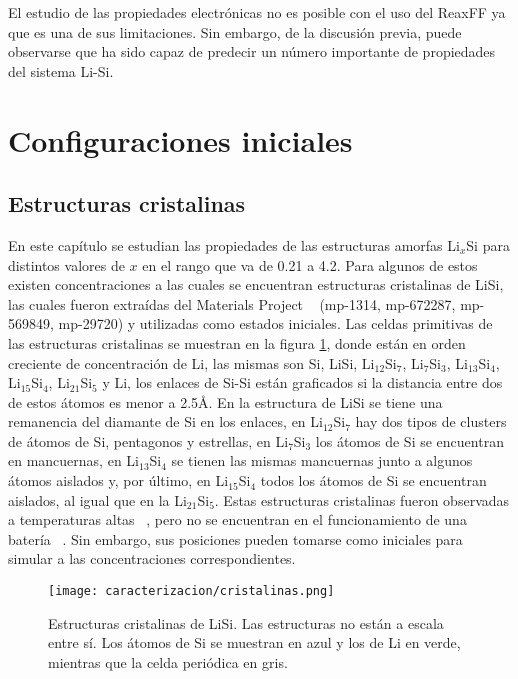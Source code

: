 El estudio de las propiedades electrónicas no es posible con el uso del ReaxFF ya
que es una de sus limitaciones. Sin embargo, de la discusión previa, puede 
observarse que ha sido capaz de predecir un número importante de propiedades del 
sistema Li-Si.


\section{Configuraciones iniciales}

\subsection{Estructuras cristalinas}

En este capítulo se estudian las propiedades de las estructuras amorfas Li$_x$Si
para distintos valores de $x$ en el rango que va de 0.21 a 4.2. Para algunos de
estos existen concentraciones a las cuales se encuentran estructuras cristalinas 
de LiSi, las cuales fueron extraídas del Materials Project 
~\cite{materials_project} (mp-1314, mp-672287, mp-569849, mp-29720) y utilizadas 
como estados iniciales. Las celdas primitivas de las estructuras cristalinas se
muestran en la figura \ref{fig:cristalinas}, donde están en orden creciente de 
concentración de Li, las mismas son Si, LiSi, Li$_{12}$Si$_7$, Li$_7$Si$_3$, 
Li$_{13}$Si$_4$, Li$_{15}$Si$_4$, Li$_{21}$Si$_5$ y Li, los enlaces de Si-Si 
están graficados si la distancia entre dos de estos átomos es menor a 2.5\AA. En 
la estructura de LiSi se tiene una remanencia del diamante de Si en los enlaces, 
en Li$_{12}$Si$_7$ hay dos tipos de clusters de átomos de Si, pentagonos y 
estrellas, en Li$_7$Si$_3$ los átomos de Si se encuentran en mancuernas, en 
Li$_{13}$Si$_4$ se tienen las mismas mancuernas junto a algunos átomos aislados y, 
por último, en Li$_{15}$Si$_{4}$ todos los átomos de Si se encuentran aislados,
al igual que en la Li$_{21}$Si$_5$. Estas estructuras cristalinas fueron 
observadas a temperaturas altas ~\cite{wen1981}, pero no se encuentran en el 
funcionamiento de una batería ~\cite{obrovac2004}. Sin embargo, sus posiciones 
pueden tomarse como iniciales para simular a las concentraciones correspondientes.
\begin{figure}[th]
    \centering
    \texttt{[image: caracterizacion/cristalinas.png]}
    \caption{Estructuras cristalinas de LiSi. Las estructuras no están a escala 
    entre sí. Los átomos de Si se muestran en azul y los de Li en verde, mientras
    que la celda periódica en gris.}
    \label{fig:cristalinas}
\end{figure}

